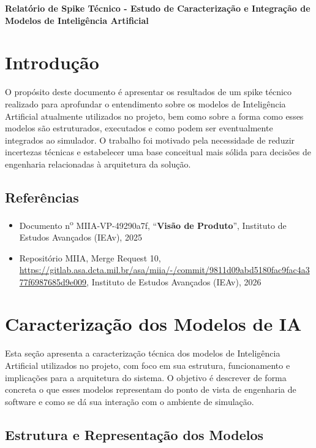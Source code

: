 \begin{center}
    \textbf{\Huge{Relatório de Spike Técnico - Estudo de Caracterização e Integração de Modelos de Inteligência Artificial}}
\end{center}

\section{Introdução}

O propósito deste documento é apresentar os resultados de um spike técnico realizado para aprofundar o entendimento sobre os modelos de Inteligência Artificial atualmente utilizados no projeto, bem como sobre a forma como esses modelos são estruturados, executados e como podem ser eventualmente integrados ao simulador. O trabalho foi motivado pela necessidade de reduzir incertezas técnicas e estabelecer uma base conceitual mais sólida para decisões de engenharia relacionadas à arquitetura da solução.

\subsection{Referências}

\begin{itemize}
    \item Documento n\textsuperscript{o} MIIA-VP-49290a7f, ``\textbf{Visão de Produto}'', Instituto de Estudos Avançados (IEAv), 2025
    \item Repositório MIIA, Merge Request 10, \url{https://gitlab.asa.dcta.mil.br/asa/miia/-/commit/9811d09abd5180fac9fac4a377f6987685d9e009}, Instituto de Estudos Avançados (IEAv), 2026
\end{itemize}
\newpage

\section{Caracterização dos Modelos de IA}

Esta seção apresenta a caracterização técnica dos modelos de Inteligência Artificial utilizados no projeto, com foco em sua estrutura, funcionamento e implicações para a arquitetura do sistema. O objetivo é descrever de forma concreta o que esses modelos representam do ponto de vista de engenharia de software e como se dá sua interação com o ambiente de simulação.

\subsection{Estrutura e Representação dos Modelos}

